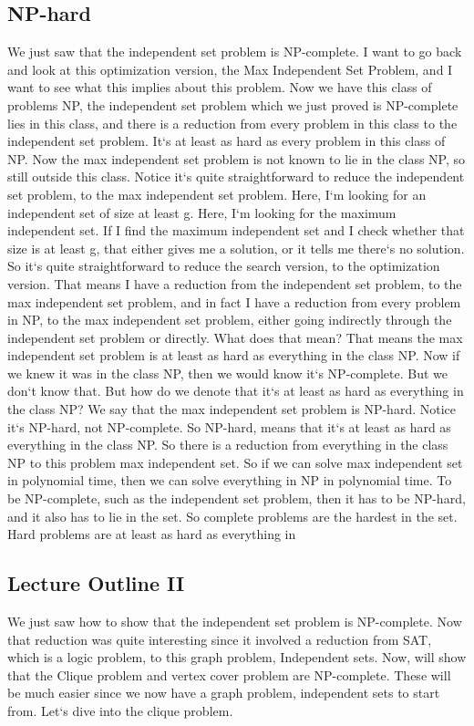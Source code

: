 \subsection{NP-hard}
We just saw that the independent set problem is NP-complete.
I want to go back and look at this optimization version, the Max Independent Set Problem, and I want to see what this implies about this problem.
Now we have this class of problems NP, the independent set problem which we just proved is NP-complete lies in this class, and there is a reduction from every problem in this class to the independent set problem.
It`s at least as hard as every problem in this class of NP\@.
Now the max independent set problem is not known to lie in the class NP, so still outside this class.
Notice it`s quite straightforward to reduce the independent set problem, to the max independent set problem.
Here, I`m looking for an independent set of size at least g.
Here, I`m looking for the maximum independent set.
If I find the maximum independent set and I check whether that size is at least g, that either gives me a solution, or it tells me there`s no solution.
So it`s quite straightforward to reduce the search version, to the optimization version.
That means I have a reduction from the independent set problem, to the max independent set problem, and in fact I have a reduction from every problem in NP, to the max independent set problem, either going indirectly through the independent set problem or directly.
What does that mean? That means the max independent set problem is at least as hard as everything in the class NP\@.
Now if we knew it was in the class NP, then we would know it`s NP-complete.
But we don`t know that.
But how do we denote that it`s at least as hard as everything in the class NP? We say that the max independent set problem is NP-hard.
Notice it`s NP-hard, not NP-complete.
So NP-hard, means that it`s at least as hard as everything in the class NP\@.
So there is a reduction from everything in the class NP to this problem max independent set.
So if we can solve max independent set in polynomial time, then we can solve everything in NP in polynomial time.
To be NP-complete, such as the independent set problem, then it has to be NP-hard, and it also has to lie in the set.
So complete problems are the hardest in the set.
Hard problems are at least as hard as everything in

\subsection{Lecture Outline II}
We just saw how to show that the independent set problem is NP-complete.
Now that reduction was quite interesting since it involved a reduction from SAT, which is a logic problem, to this graph problem, Independent sets.
Now, will show that the Clique problem and vertex cover problem are NP-complete.
These will be much easier since we now have a graph problem, independent sets to start from.
Let`s dive into the clique problem.

